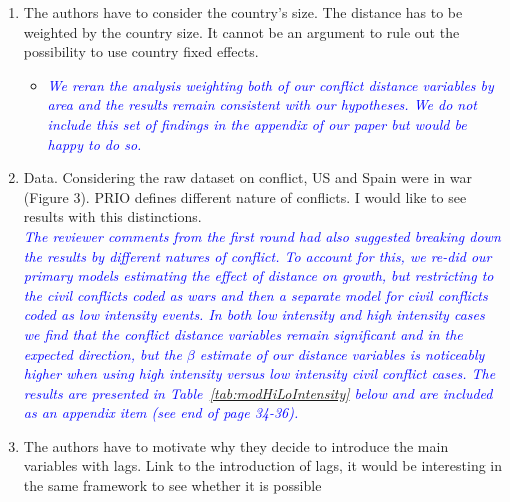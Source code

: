 \begin{enumerate}
\begin{itemize}
\end{itemize}



\FloatBarrier

\newpage
\item The authors have to consider the country’s size. The distance has to be weighted by the country size. It cannot be an argument to rule out the possibility to use country fixed effects. \\

\begin{itemize}
\item \textcolor{blue}{\emph{
	We reran the analysis weighting both of our conflict distance variables by area and the results remain consistent with our hypotheses. We do not include this set of findings in the appendix of our paper but would be happy to do so.
}} \\

\end{itemize}
\FloatBarrier

\newpage
\item Data. Considering the raw dataset on conflict, US and Spain were in war (Figure 3). PRIO defines different nature of conflicts. I would like to see results with this distinctions. \\

\textcolor{blue}{\emph{
	The reviewer comments from the first round had also suggested breaking down the results by different natures of conflict. To account for this, we re-did our primary models estimating the effect of distance on growth, but restricting to the civil conflicts coded as wars and then a separate model for civil conflicts coded as low intensity events. In both low intensity and high intensity cases we find that the conflict distance variables remain significant and in the expected direction, but the $\beta$ estimate of our distance variables is noticeably higher when using high intensity versus low intensity civil conflict cases. The results are presented in Table~\ref{tab:modHiLoIntensity} below and are included as an appendix item (see end of page 34-36).
}} \\

\FloatBarrier

\item The authors have to motivate why they decide to introduce the main variables with lags. Link to the introduction of lags, it would be interesting in the same framework to see whether it is possible \\


\end{enumerate}
